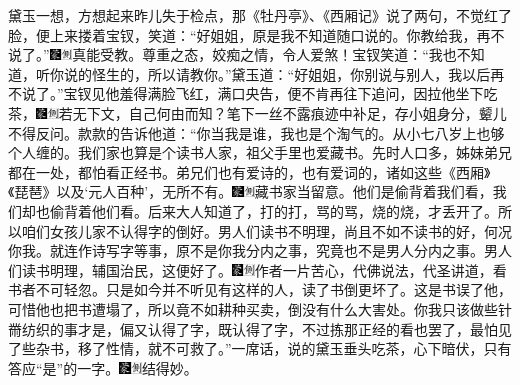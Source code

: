 黛玉一想，方想起来昨儿失于检点，那《牡丹亭》、《西厢记》说了两句，不觉红了脸，便上来搂着宝钗，笑道：``好姐姐，原是我不知道随口说的。你教给我，再不说了。''{\includegraphics[width=3mm]{../Images/00006}\includegraphics[width=3mm]{../Images/00011}\footnotesize \kaishu 真能受教。尊重之态，姣痴之情，令人爱煞！}宝钗笑道：``我也不知道，听你说的怪生的，所以请教你。''黛玉道：``好姐姐，你别说与别人，我以后再不说了。''宝钗见他羞得满脸飞红，满口央告，便不肯再往下追问，因拉他坐下吃茶，{\includegraphics[width=3mm]{../Images/00006}\includegraphics[width=3mm]{../Images/00011}\footnotesize \kaishu 若无下文，自己何由而知？笔下一丝不露痕迹中补足，存小姐身分，颦儿不得反问。}款款的告诉他道：``你当我是谁，我也是个淘气的。从小七八岁上也够个人缠的。我们家也算是个读书人家，祖父手里也爱藏书。先时人口多，姊妹弟兄都在一处，都怕看正经书。弟兄们也有爱诗的，也有爱词的，诸如这些《西厢》《琵琶》以及`元人百种'，无所不有。{\includegraphics[width=3mm]{../Images/00006}\includegraphics[width=3mm]{../Images/00011}\footnotesize \kaishu 藏书家当留意。}他们是偷背着我们看，我们却也偷背着他们看。后来大人知道了，打的打，骂的骂，烧的烧，才丢开了。所以咱们女孩儿家不认得字的倒好。男人们读书不明理，尚且不如不读书的好，何况你我。就连作诗写字等事，原不是你我分内之事，究竟也不是男人分内之事。男人们读书明理，辅国治民，这便好了。{\includegraphics[width=3mm]{../Images/00006}\includegraphics[width=3mm]{../Images/00011}\footnotesize \kaishu 作者一片苦心，代佛说法，代圣讲道，看书者不可轻忽。}只是如今并不听见有这样的人，读了书倒更坏了。这是书误了他，可惜他也把书遭塌了，所以竟不如耕种买卖，倒没有什么大害处。你我只该做些针黹纺织的事才是，偏又认得了字，既认得了字，不过拣那正经的看也罢了，最怕见了些杂书，移了性情，就不可救了。''一席话，说的黛玉垂头吃茶，心下暗伏，只有答应``是''的一字。{\includegraphics[width=3mm]{../Images/00006}\includegraphics[width=3mm]{../Images/00011}\footnotesize \kaishu 结得妙。}

